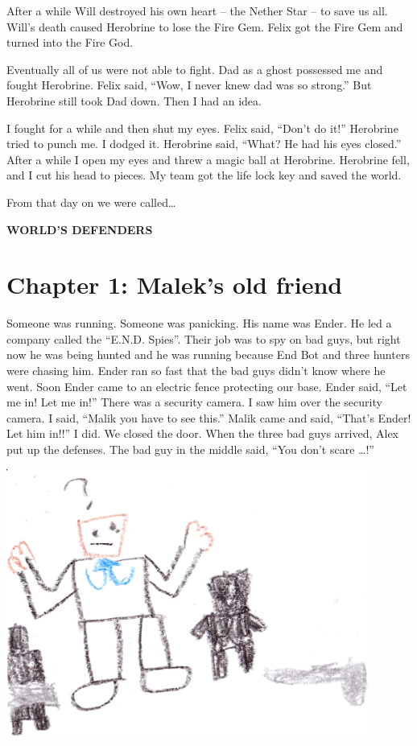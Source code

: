 \documentclass[12pt,oneside]{krantz}
\begin{document}
After a while Will destroyed his own heart -- the Nether Star -- to save
us all. Will's death caused Herobrine to lose the Fire Gem. Felix got
the Fire Gem and turned into the Fire God.

Eventually all of us were not able to fight. Dad as a ghost possessed me
and fought Herobrine. Felix said, ``Wow, I never knew dad was so
strong.'' But Herobrine still took Dad down. Then I had an idea.

I fought for a while and then shut my eyes. Felix said, ``Don't do it!''
Herobrine tried to punch me. I dodged it. Herobrine said, ``What? He had
his eyes closed.'' After a while I open my eyes and threw a magic ball
at Herobrine. Herobrine fell, and I cut his head to pieces. My team got
the life lock key and saved the world.

From that day on we were called\ldots{}

\textbf{WORLD'S DEFENDERS}

\hypertarget{chapter-1-maleks-old-friend}{%
\chapter*{Chapter 1: Malek's old
friend}\label{chapter-1-maleks-old-friend}}


Someone was running. Someone was panicking. His name was Ender. He led a
company called the ``E.N.D. Spies''. Their job was to spy on bad guys,
but right now he was being hunted and he was running because End Bot and
three hunters were chasing him. Ender ran so fast that the bad guys
didn't know where he went. Soon Ender came to an electric fence
protecting our base. Ender said, ``Let me in! Let me in!'' There was a
security camera. I saw him over the security camera. I said, ``Malik you
have to see this.'' Malik came and said, ``That's Ender! Let him in!!''
I did. We closed the door. When the three bad guys arrived, Alex put up
the defenses. The bad guy in the middle said, ``You don't scare
\ldots{}!''

\includegraphics[width=4.6875in,height=\textheight]{img/four-bad-guys/scared.jpg}
\end{document}
